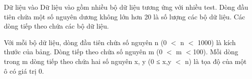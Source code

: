 Dữ liệu vào
Dữ liệu vào gồm nhiều bộ dữ liệu tương ứng với nhiều test. Dòng đầu tiên chứa một số nguyên dương không lớn hơn 20 là số lượng các bộ dữ liệu. Các dòng tiếp theo chứa các bộ dữ liệu.  

   Với mỗi bộ dữ liệu, dòng đầu tiên chứa số nguyên n (0 $<$ n $<$ 1000) là kích thước của bảng. Dòng tiếp theo chứa số nguyên m (0 $<$ m $<$100). Mỗi dòng trong m dòng tiếp theo chứa hai số nguyên x, y (0 ≤ x,y $<$ n)  là tọa độ của một ô có giá trị 0.